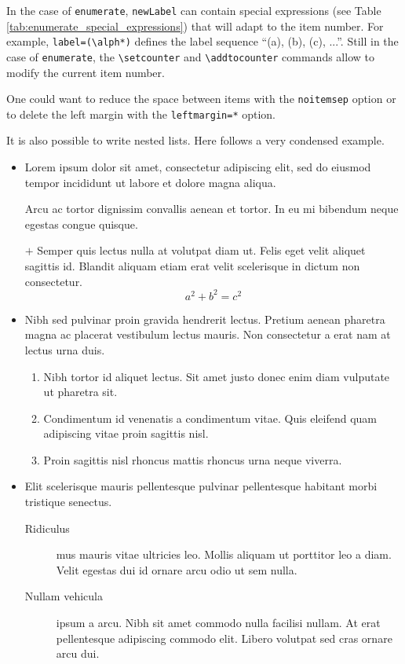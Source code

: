 \documentclass[a4paper, 12pt]{report}
\def\tbs{\textbackslash}
\begin{document}
    In the case of \texttt{enumerate}, \texttt{newLabel} can contain special expressions (see Table \ref{tab:enumerate_special_expressions}) that will adapt to the item number. For example, \texttt{label=(\tbs{}alph*)} defines the label sequence \enquote{(a), (b), (c), ...}. Still in the case of \texttt{enumerate}, the  \texttt{\tbs{}setcounter} and \texttt{\tbs{}addtocounter} commands allow to modify the current item number.

    One could want to reduce the space between items with the \texttt{noitemsep} option or to delete the left margin with the \texttt{leftmargin=*} option.

    It is also possible to write nested lists. Here follows a very condensed example.

    \begin{itemize}[leftmargin=*]
        \item Lorem ipsum dolor sit amet, consectetur adipiscing elit, sed do eiusmod tempor incididunt ut labore et dolore magna aliqua.

        Arcu ac tortor dignissim convallis aenean et tortor. In eu mi bibendum neque egestas congue quisque.

        \item[$+$] Semper quis lectus nulla at volutpat diam ut. Felis eget velit aliquet sagittis id. Blandit aliquam etiam erat velit scelerisque in dictum non consectetur.
        \begin{equation}
            a^2 + b^2 = c^2
        \end{equation}

        \item Nibh sed pulvinar proin gravida hendrerit lectus. Pretium aenean pharetra magna ac placerat vestibulum lectus mauris. Non consectetur a erat nam at lectus urna duis.
        \begin{enumerate}[noitemsep, label=\roman*.]
            \item Nibh tortor id aliquet lectus. Sit amet justo donec enim diam vulputate ut pharetra sit.
            \setcounter{enumi}{3}
            \item Condimentum id venenatis a condimentum vitae. Quis eleifend quam adipiscing vitae proin sagittis nisl.
            \addtocounter{enumi}{15}
            \item Proin sagittis nisl rhoncus mattis rhoncus urna neque viverra.
        \end{enumerate}

        \item Elit scelerisque mauris pellentesque pulvinar pellentesque habitant morbi tristique senectus.
            \begin{description}
                \item[Ridiculus] mus mauris vitae ultricies leo. Mollis aliquam ut porttitor leo a diam. Velit egestas dui id ornare arcu odio ut sem nulla.
                \item[Nullam vehicula] ipsum a arcu. Nibh sit amet commodo nulla facilisi nullam. At erat pellentesque adipiscing commodo elit. Libero volutpat sed cras ornare arcu dui.
            \end{description}
    \end{itemize}
\end{document}
